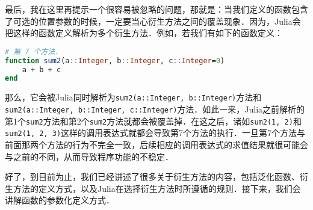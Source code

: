 最后，我在这里再提示一个很容易被忽略的问题，那就是：当我们定义的函数包含了可选的位置参数的时候，一定要当心衍生方法之间的覆盖现象．因为，Julia会把这样的函数定义解析为多个衍生方法．例如，若我们有如下的函数定义：

\begin{lstlisting}[language=julia]
# 第 7 个方法．
function sum2(a::Integer, b::Integer, c::Integer=0)
    a + b + c
end
\end{lstlisting}

那么，它会被Julia同时解析为\verb|sum2(a::Integer, b::Integer)|方法和\verb|sum2(a::Integer, b::Integer, c::Integer)|方法．如此一来，Julia之前解析的第1个\verb|sum2|方法和第2个\verb|sum2|方法就都会被覆盖掉．在这之后，诸如\verb|sum2(1, 2)|和\verb|sum2(1, 2, 3)|这样的调用表达式就都会导致第7个方法的执行．一旦第7个方法与前面那两个方法的行为不完全一致，后续相应的调用表达式的求值结果就很可能会与之前的不同，从而导致程序功能的不稳定．

好了，到目前为止，我们已经讲述了很多关于衍生方法的内容，包括泛化函数、衍生方法的定义方式，以及Julia在选择衍生方法时所遵循的规则．接下来，我们会讲解函数的参数化定义方式．